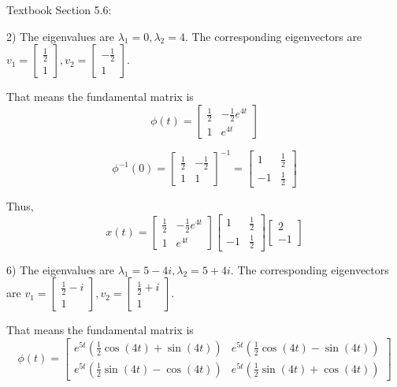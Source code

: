 \documentclass{article}
\begin{document}
Textbook Section 5.6:

2) The eigenvalues are $\lambda_1 = 0, \lambda_2 = 4$.
The corresponding eigenvectors are $v_1 = \begin{bmatrix}
    \frac{1}{2} \\
    1
\end{bmatrix}, v_2 = \begin{bmatrix}
    -\frac{1}{2} \\
    1
\end{bmatrix}$.

That means the fundamental matrix is
\[\phi(t) = \begin{bmatrix}
    \frac{1}{2} & -\frac{1}{2} e^{4t} \\
    1 & e^{4t}
\end{bmatrix}\]

\[\phi^{-1}(0) = \begin{bmatrix}
    \frac{1}{2} & -\frac{1}{2} \\
    1 & 1
\end{bmatrix}^{-1} = \begin{bmatrix}
    1 & \frac{1}{2} \\
    -1 & \frac{1}{2}
\end{bmatrix}\]

Thus,
\[x(t) = \begin{bmatrix}
    \frac{1}{2} & -\frac{1}{2} e^{4t} \\
    1 & e^{4t}
\end{bmatrix} \begin{bmatrix}
    1 & \frac{1}{2} \\
    -1 & \frac{1}{2}
\end{bmatrix} \begin{bmatrix}
    2 \\
    -1
\end{bmatrix}\]

6) The eigenvalues are $\lambda_1 = 5-4i, \lambda_2 = 5+4i$.
The corresponding eigenvectors are $v_1 = \begin{bmatrix}
    \frac{1}{2} - i \\
    1
\end{bmatrix}, v_2 = \begin{bmatrix}
    \frac{1}{2} + i \\
    1
\end{bmatrix}$.

That means the fundamental matrix is
\[\phi(t) = \begin{bmatrix}
    e^{5t} (\frac{1}{2} \cos(4t) + \sin(4t)) & e^{5t} (\frac{1}{2} \cos(4t) - \sin(4t)) \\
    e^{5t} (\frac{1}{2} \sin(4t) - \cos(4t)) & e^{5t} (\frac{1}{2} \sin(4t) + \cos(4t)) 
\end{bmatrix}\]
\end{document}
